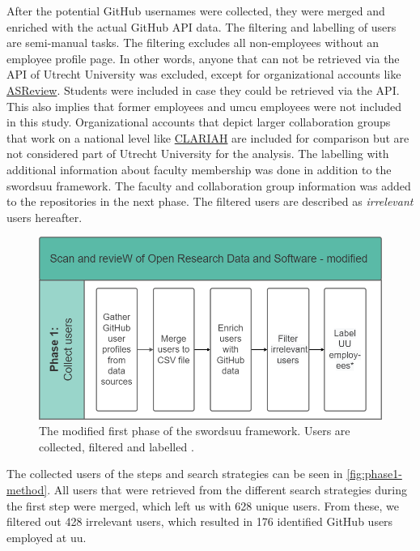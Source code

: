 After the potential GitHub usernames were collected, they were merged and enriched with the actual GitHub API data.
The filtering and labelling of users are semi-manual tasks. The filtering excludes all non-employees without an employee profile page. In other words, anyone that can not be retrieved via the API of Utrecht University was excluded, except for organizational accounts like \href{https://github.com/asreview}{ASReview}. Students were included in case they could be retrieved via the API. This also implies that former employees and \acrfull{umcu} employees were not included in this study. Organizational accounts that depict larger collaboration groups that work on a national level like \href{https://github.com/CLARIAH}{CLARIAH} are included for comparison but are not considered part of Utrecht University for the analysis.
The labelling with additional information about faculty membership was done in addition to the \acrshort{swordsuu} framework. 
The faculty and collaboration group information was added to the repositories in the next phase. The filtered users are described as \textit{irrelevant} users hereafter.


\begin{figure}[h!]
\centering
\includegraphics[scale=0.48]{figures/SWORDS-thesis-phase1.drawio.png}
\caption{The modified first phase of the \acrshort{swordsuu} framework. Users are collected, filtered and labelled \cite{de_Bruin_Scan_and_revieW_2021}. 
\label{fig:phase1}}
\end{figure}

The collected users of the steps and search strategies can be seen in \autoref{fig:phase1-method}. All users that were retrieved from the different search strategies during the first step were merged, which left us with 628 unique users. From these, we filtered out 428 irrelevant users, which resulted in 176 identified GitHub users employed at \acrshort{uu}.


